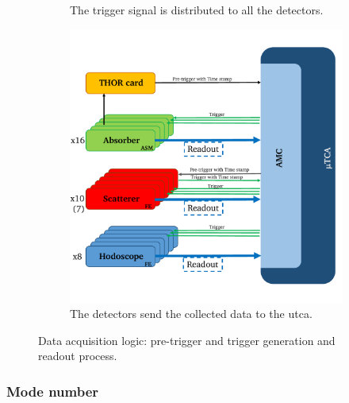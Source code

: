 \begin{figure}
\begin{subfigure}[b]{0.5\textwidth}
\caption[Trigger signal is distributed to all the detectors.]{The trigger signal is distributed to all the detectors.}\label{chapappA::subfig::triggerLogic_5}
\end{subfigure}%
\begin{subfigure}[b]{0.5\textwidth}
 \centering
\includegraphics[width=0.9\linewidth]{03_GraphicFiles/appendixA_dataFormat/triggerLogic_6.pdf}
\caption[The detectors send the collected data to the \gls{utca}.]{The detectors send the collected data to the \gls{utca}.}\label{chapappA::subfig::triggerLogic_6}
\end{subfigure}%
\caption{Data acquisition logic: pre-trigger and trigger generation and readout process.}
\label{chapappA::fig::triggerGeneration}
\end{figure}


\subsubsection{Mode number}\label{chapappA::subsubsec::modeN}

